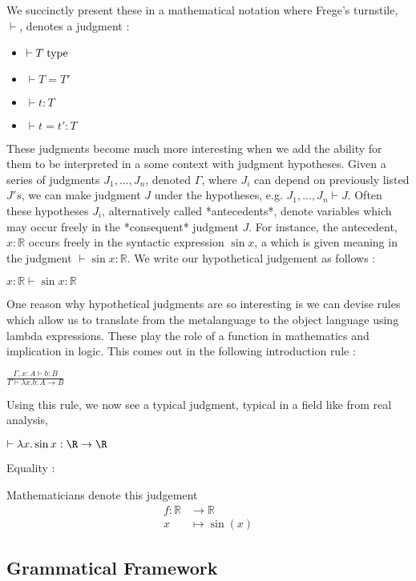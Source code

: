 \documentclass[11pt, a4paper]{article}
\begin{document}
We succinctly present these in a mathematical notation where Frege's turnstile,
$\vdash$, denotes a judgment :

\begin{itemize}[noitemsep]
\item $\vdash T \; {\rm type}$
\item $\vdash T = T'$
\item $\vdash t:T$
\item $\vdash t = t':T$
\end{itemize}

These judgments become much more interesting when we add the ability for them to
be interpreted in a some context with judgment hypotheses. Given a series of
judgments $J_1,...,J_n$, denoted $\Gamma$, where $J_i$ can depend on previously
listed $J's$, we can make judgment $J$ under the hypotheses, e.g. $J_1,...,J_n
\vdash J$. Often these hypotheses $J_i$, alternatively called *antecedents*,
denote variables which may occur freely in the *consequent* judgment $J$. For
instance, the antecedent, $x : \mathbb{R}$ occurs freely in the syntactic
expression $\sin x$, a which is given meaning in the judgment $\vdash \sin x { :
} \mathbb{R}$. We write our hypothetical judgement as follows :

$x : \mathbb{R} \vdash \sin x : \mathbb{R}$

One reason why hypothetical judgments are so interesting is we can devise rules
which allow us to translate from the metalanguage to the object language using
lambda expressions. These play the role of a function in mathematics and
implication in logic. This comes out in the following introduction rule :

$ \frac{\Gamma, x : A \vdash b : B} {\Gamma \vdash \lambda x. b : A \rightarrow
B} $

Using this rule, we now see a typical judgment, typical in a field like from
real analysis,

$\vdash \lambda x. \sin x : \R \rightarrow \R$

Equality :

Mathematicians denote this judgement
\begin{align*} f {:} \mathbb{R} &\rightarrow \mathbb{R}\\ x &\mapsto \sin ( x )
\end{align*}

\subsection{Grammatical Framework}
\end{document}
